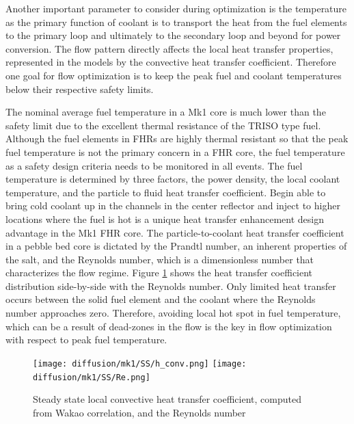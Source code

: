 \documentclass{elsarticle}
\begin{document}
Another important parameter to consider during optimization is the temperature as the primary function of coolant is to transport the heat from the fuel elements to the primary loop and ultimately to the secondary loop and beyond for power conversion. The flow pattern directly affects the local heat transfer properties, represented in the models by the convective heat transfer coefficient.   
Therefore one goal for flow optimization is to keep the peak fuel and coolant temperatures below their respective safety limits. 

The nominal average fuel temperature in a Mk1 core is much lower than the safety limit due to the excellent thermal resistance of the TRISO type fuel. 
Although the fuel elements in FHRs are highly thermal resistant so that the peak fuel temperature is not the primary concern in a FHR core, the fuel temperature as a safety design criteria needs to be monitored in all events. The fuel temperature is determined by three factors, the power density, the local coolant temperature, and the particle to fluid heat transfer coefficient. Begin able to bring cold coolant up in the channels in the center reflector and inject to higher locations where the fuel is hot is a unique heat transfer enhancement design advantage in the Mk1 FHR core. The particle-to-coolant heat transfer coefficient in a pebble bed core is dictated by the Prandtl number, an inherent properties of the salt, and the Reynolds number, which is a dimensionless number that characterizes the flow regime. Figure \ref{fig:h_conv} shows the heat transfer coefficient distribution side-by-side with the Reynolds number. Only limited heat transfer occurs between the solid fuel element and the coolant where the Reynolds number approaches zero.
Therefore, avoiding local hot spot in fuel temperature, which can be a result of dead-zones in the flow is the key in flow optimization with respect to peak fuel temperature. 


\begin{figure}
\centering
  \texttt{[image: diffusion/mk1/SS/h\_conv.png]}
  \texttt{[image: diffusion/mk1/SS/Re.png]}
  \caption{Steady state local convective heat transfer coefficient, computed from Wakao correlation, and the Reynolds number}
  \label{fig:h_conv}
\end{figure}
\end{document}
